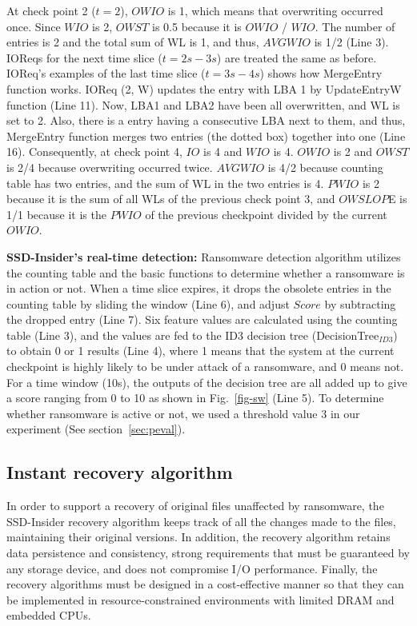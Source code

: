 \documentclass[conference]{IEEEtran}
\newcommand{\ours}{SSD-Insider}
\begin{document}
At check point 2 ($t=2$), $OWIO$ is 1, which means that overwriting occurred once. 
Since $WIO$ is 2, $OWST$ is 0.5 because it is $OWIO$ / $WIO$. 
The number of entries is 2 and the total sum of WL is 1, and thus, $AVGWIO$ is 1/2 (Line 3). 
IOReqs for the next time slice ($t=2s-3s$) are treated the same as before. 
IOReq's examples of the last time slice ($t=3s-4s$) shows how MergeEntry function works.
IOReq (2, W) updates the entry with LBA 1 by UpdateEntryW function (Line 11). 
Now, LBA1 and LBA2 have been all overwritten, and WL is set to 2. 
Also, there is a entry having a consecutive LBA next to them, and thus,
MergeEntry function merges two entries (the dotted box) together into one (Line 16).
Consequently, at check point 4, $IO$ is 4 and $WIO$ is 4. $OWIO$ is 2 and $OWST$ is 2/4 because overwriting occurred twice. $AVGWIO$ is 4/2 because counting table has two entries,
and the sum of WL in the two entries is 4. $PWIO$ is 2 because it is the sum of 
all WLs of the previous check point 3, and $OWSLOP$E is 1/1 because it is the $PWIO$ of 
the previous checkpoint divided by the current $OWIO$.

{\bf \ours{}'s real-time detection:} Ransomware detection algorithm utilizes
the counting table and the basic functions to determine whether a ransomware is in action or not. 
When a time slice expires, 
it drops the obsolete entries in the counting table by sliding the window (Line 6),
and adjust $Score$ by subtracting the dropped entry (Line 7).
Six feature values are calculated using the counting table (Line 3),
and the values are fed to the ID3 decision tree (DecisionTree$_{ID3}$) to obtain 0 or 1 results (Line 4),
where 1 means that the system at the current checkpoint is highly likely to be under attack
of a ransomware, and 0 means not. For a time window (10s), the outputs of the decision tree are all added up to 
give a score ranging from 0 to 10 as shown in Fig.~\ref{fig-sw} (Line 5). 
To determine whether ransomware is active or not, we used
a threshold value 3 in our experiment (See section~\ref{sec:peval}).



\subsection{Instant recovery algorithm}

\label{sec:recovery}
In order to support a recovery of original files unaffected by
ransomware, the \ours{} recovery algorithm keeps track of all the
changes made to the files, maintaining their original versions.  In
addition, the recovery algorithm retains data persistence and
consistency, strong requirements that must be guaranteed by any
storage device, and does not compromise I/O performance.  Finally,
the recovery algorithms must be designed in a cost-effective manner
so that they can be implemented in resource-constrained
environments with limited DRAM and embedded CPUs.  
\end{document}
